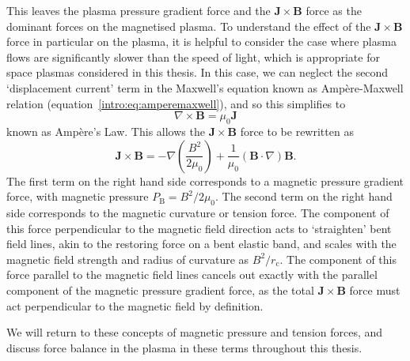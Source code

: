This leaves the plasma pressure gradient force and the $\boldsymbol{J}\times\boldsymbol{B}$ force as the dominant forces on the magnetised plasma. To understand the effect of the $\boldsymbol{J}\times\boldsymbol{B}$ force in particular on the plasma, it is helpful to consider the case where plasma flows are significantly slower than the speed of light, which is appropriate for space plasmas considered in this thesis. In this case, we can neglect the second `displacement current' term in the Maxwell's equation known as Amp\`ere-Maxwell relation (equation~\ref{intro:eq:amperemaxwell}), and so this simplifies to 
\begin{equation}\label{intro:eq:ampere}
\nabla \times \boldsymbol{B} = \mu_0 \boldsymbol{J} 
\end{equation}
known as Amp\`ere's Law. This allows the $\boldsymbol{J}\times\boldsymbol{B}$ force to be rewritten as
\begin{equation}\label{intro:eq:bpressuretension}
\boldsymbol{J}\times\boldsymbol{B} = -\nabla\left(\frac{B^2}{2\mu_0}\right)+\frac{1}{\mu_0}(\boldsymbol{B}\cdot\nabla)\boldsymbol{B}.
\end{equation}
The first term on the right hand side corresponds to a magnetic pressure gradient force, with magnetic pressure $P_\mathrm{B} = B^2/2\mu_0$. The second term on the right hand side corresponds to the magnetic curvature or tension force. The component of this force perpendicular to the magnetic field direction acts to `straighten' bent field lines, akin to the restoring force on a bent elastic band, and scales with the magnetic field strength and radius of curvature as $B^2/r_\mathrm{c}$. The component of this force parallel to the magnetic field lines cancels out exactly with the parallel component of the magnetic pressure gradient force, as the total $\boldsymbol{J}\times\boldsymbol{B}$ force must act perpendicular to the magnetic field by definition.

We will return to these concepts of magnetic pressure and tension forces, and discuss force balance in the plasma in these terms throughout this thesis.

